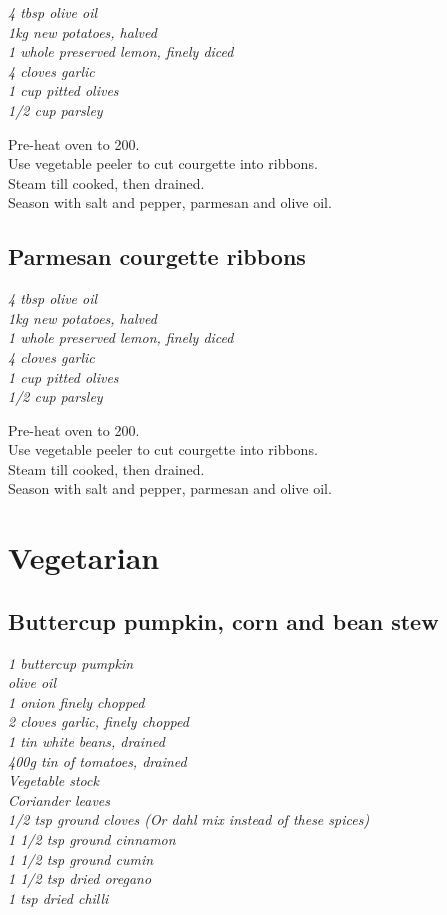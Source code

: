 \documentclass{tufte-book}
\begin{document}
\emph{4 tbsp olive oil
\\1kg new potatoes, halved
\\1 whole preserved lemon, finely diced
\\4 cloves garlic
\\1 cup pitted olives
\\1/2 cup parsley
}

\smallskip
Pre-heat oven to 200\celsius.
\\Use vegetable peeler to cut courgette into ribbons.
\\Steam till cooked, then drained.
\\Season with salt and pepper, parmesan and olive oil.


\section{Parmesan courgette ribbons}

\emph{4 tbsp olive oil
\\1kg new potatoes, halved
\\1 whole preserved lemon, finely diced
\\4 cloves garlic
\\1 cup pitted olives
\\1/2 cup parsley
}

\smallskip
Pre-heat oven to 200\celsius.
\\Use vegetable peeler to cut courgette into ribbons.
\\Steam till cooked, then drained.
\\Season with salt and pepper, parmesan and olive oil.

\chapter{Vegetarian}

\section{Buttercup pumpkin, corn and bean stew}

\emph{1 buttercup pumpkin
\\olive oil
\\1 onion finely chopped
\\2 cloves garlic, finely chopped
\\1 tin white beans, drained
\\400g tin of tomatoes, drained
\\Vegetable stock
\\Coriander leaves 
\\1/2 tsp ground cloves  (Or dahl mix instead of these spices)
\\1 1/2 tsp ground cinnamon
\\1 1/2 tsp ground cumin
\\1 1/2 tsp dried oregano
\\1 tsp dried chilli
}
\end{document}
